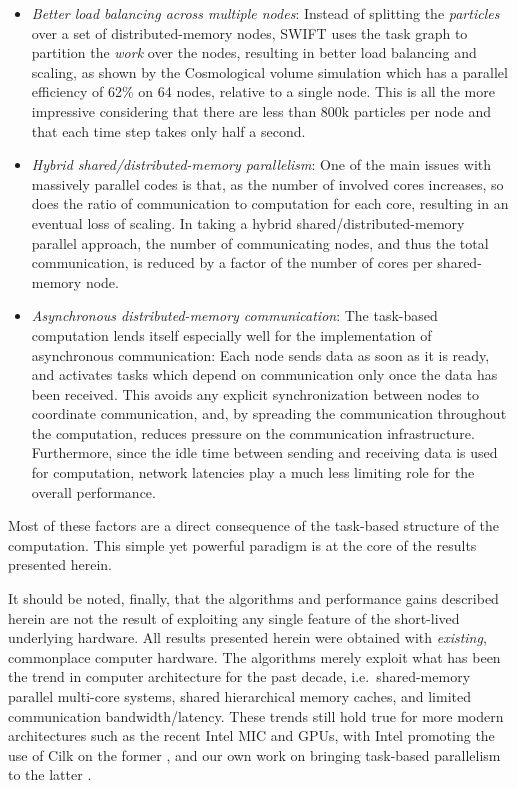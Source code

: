 \documentclass[final]{siamltex}
\begin{document}
\begin{itemize}
    \item {\em Better load balancing across multiple nodes}: Instead of
        splitting the {\em particles} over a set of distributed-memory nodes,
        SWIFT uses the task graph to partition the {\em work} over
        the nodes, resulting
        in better load balancing and scaling, as shown by the Cosmological
        volume simulation which has a parallel efficiency of 62\% on 64
        nodes, relative to a single node.
        This is all the more impressive considering that there are less than
        800k particles per node and that each time step takes only half
        a second.
    
    \item {\em Hybrid shared/distributed-memory parallelism}: One of the
        main issues with massively parallel codes is that, as the number
        of involved cores increases, so does the ratio of communication
        to computation for each core, resulting in an eventual loss of scaling.
        In taking a hybrid shared/distributed-memory parallel approach,
        the number of communicating nodes, and thus the total communication,
        is reduced by a factor of the number of cores per shared-memory node.
        
    \item {\em Asynchronous distributed-memory communication}: The task-based
        computation lends itself especially well for the implementation
        of asynchronous communication: Each node sends data as soon
        as it is ready, and activates tasks which depend on communication
        only once the data has been received.
        This avoids any explicit synchronization between nodes to coordinate
        communication, and, by spreading the communication throughout the
        computation, reduces pressure on the communication infrastructure.
        Furthermore, since the idle time between sending and receiving
        data is used for computation, network latencies play a much
        less limiting role for the overall performance.
    
\end{itemize}

Most of these factors are a direct consequence of the task-based
structure of the computation.
This simple yet powerful paradigm is at the core of the results
presented herein.

It should be noted, finally, that the algorithms and performance gains
described herein are not the result of exploiting any single feature
of the short-lived underlying hardware.
All results presented herein were obtained with {\em existing}, commonplace
computer hardware.
The algorithms merely exploit what has been the trend in computer
architecture for the past decade, i.e.~shared-memory parallel multi-core
systems, shared hierarchical memory caches, and limited communication
bandwidth/latency.
These trends still hold true for more modern architectures such as
the recent Intel MIC and GPUs, with Intel promoting the use of Cilk 
on the former \cite{ref:Reinders2012},
and our own work on bringing task-based parallelism to the latter
\cite{ref:Chalk2014}.
\end{document}
